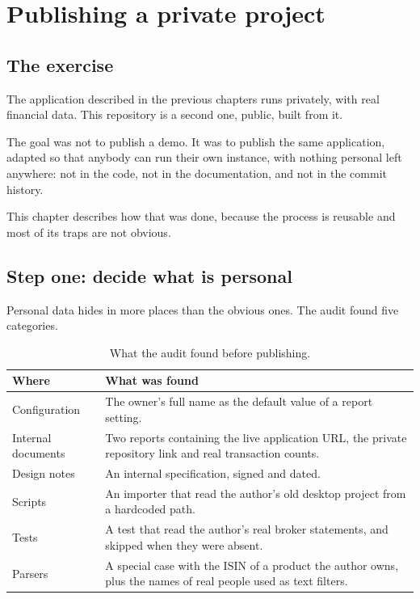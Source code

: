 \chapter{Publishing a private project}
\label{ch:going-public}

\section{The exercise}

The application described in the previous chapters runs privately, with real
financial data. This repository is a second one, public, built from it.

The goal was not to publish a demo. It was to publish the same application,
adapted so that anybody can run their own instance, with nothing personal left
anywhere: not in the code, not in the documentation, and not in the commit
history.

This chapter describes how that was done, because the process is reusable and
most of its traps are not obvious.

\section{Step one: decide what is personal}

Personal data hides in more places than the obvious ones. The audit found five
categories.

\begin{table}[h]
\centering
\begin{tabular}{@{}p{4.2cm}p{9.5cm}@{}}
\toprule
\textbf{Where} & \textbf{What was found} \\
\midrule
Configuration & The owner's full name as the default value of a report setting. \\
Internal documents & Two reports containing the live application URL, the private
repository link and real transaction counts. \\
Design notes & An internal specification, signed and dated. \\
Scripts & An importer that read the author's old desktop project from a
hardcoded path. \\
Tests & A test that read the author's real broker statements, and skipped when
they were absent. \\
Parsers & A special case with the ISIN of a product the author owns, plus the
names of real people used as text filters. \\
\bottomrule
\end{tabular}
\caption{What the audit found before publishing.}
\end{table}


